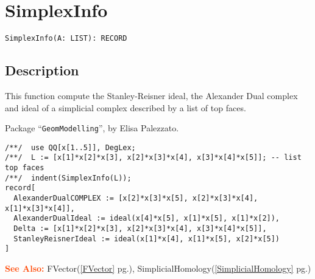 \documentclass[a4paper]{mybook}
\newenvironment{command}{}{} %
\newcommand\SeeAlso{\par\textcolor{OrangeRed}{\textbf{\large See Also: }}}
\begin{document}
\section{SimplexInfo}
\label{SimplexInfo}
\begin{command} %


\begin{Verbatim}[label=syntax, rulecolor=\color{MidnightBlue},
frame=single]
SimplexInfo(A: LIST): RECORD
\end{Verbatim}


\subsection*{Description}

This function compute the Stanley-Reisner ideal, the Alexander Dual
complex and ideal of a simplicial complex described by a list of top
faces.
\par 
Package ``\verb&GeomModelling&'', by Elisa Palezzato.
\begin{Verbatim}[label=example, rulecolor=\color{PineGreen}, frame=single]
/**/  use QQ[x[1..5]], DegLex;
/**/  L := [x[1]*x[2]*x[3], x[2]*x[3]*x[4], x[3]*x[4]*x[5]]; -- list top faces
/**/  indent(SimplexInfo(L));
record[
  AlexanderDualCOMPLEX := [x[2]*x[3]*x[5], x[2]*x[3]*x[4], x[1]*x[3]*x[4]],
  AlexanderDualIdeal := ideal(x[4]*x[5], x[1]*x[5], x[1]*x[2]),
  Delta := [x[1]*x[2]*x[3], x[2]*x[3]*x[4], x[3]*x[4]*x[5]],
  StanleyReisnerIdeal := ideal(x[1]*x[4], x[1]*x[5], x[2]*x[5])
]
\end{Verbatim}


\SeeAlso %
  FVector(\ref{FVector} pg.\pageref{FVector}), 
    SimplicialHomology(\ref{SimplicialHomology} pg.\pageref{SimplicialHomology})
\end{command} %
\end{document}

